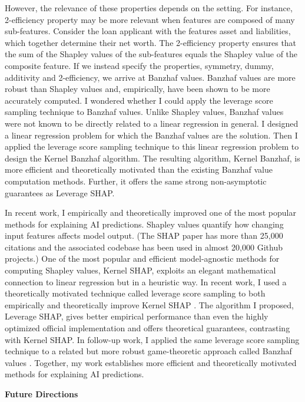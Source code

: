 \documentclass[11pt]{article}
\begin{document}
{However, the relevance of these properties depends on the setting.
For instance, 2-efficiency property may be more relevant when features are composed of many sub-features.
Consider the loan applicant with the features asset and liabilities, which together determine their net worth.
The 2-efficiency property ensures that the sum of the Shapley values of the sub-features equals the Shapley value of the composite feature.
If we instead specify the properties, symmetry, dummy, additivity and 2-efficiency, we arrive at Banzhaf values.
Banzhaf values are more robust than Shapley values and, empirically, have been shown to be more accurately computed.
I wondered whether I could apply the leverage score sampling technique to Banzhaf values.
Unlike Shapley values, Banzhaf values were not known to be directly related to a linear regression in general.
I designed a linear regression problem for which the Banzhaf values are the solution.
Then I applied the leverage score sampling technique to this linear regression problem to design the Kernel Banzhaf algorithm.
The resulting algorithm, Kernel Banzhaf, is more efficient and theoretically motivated than the existing Banzhaf value computation methods.
Further, it offers the same strong non-asymptotic guarantees as Leverage SHAP.

In recent work, I empirically and theoretically improved one of the most popular methods for explaining AI predictions. Shapley values quantify how changing input features affects model output. (The SHAP paper has more than 25,000 citations and the associated codebase has been used in almost 20,000 Github projects.) One of the most popular and efficient model-agnostic methods for computing Shapley values, Kernel SHAP, exploits an elegant mathematical connection to linear regression but in a heuristic way. In recent work, I used a theoretically motivated technique called leverage score sampling to both empirically and theoretically improve Kernel SHAP \cite{musco2024leverage}. The algorithm I proposed, Leverage SHAP, gives better empirical performance than even the highly optimized official implementation and offers theoretical guarantees, contrasting with Kernel SHAP. In follow-up work, I applied the same leverage score sampling technique to a related but more robust game-theoretic approach called Banzhaf values \cite{liu2024kernel}. Together, my work establishes more efficient and theoretically motivated methods for explaining AI predictions.

{ \large \textbf{Future Directions}}

}
\end{document}
